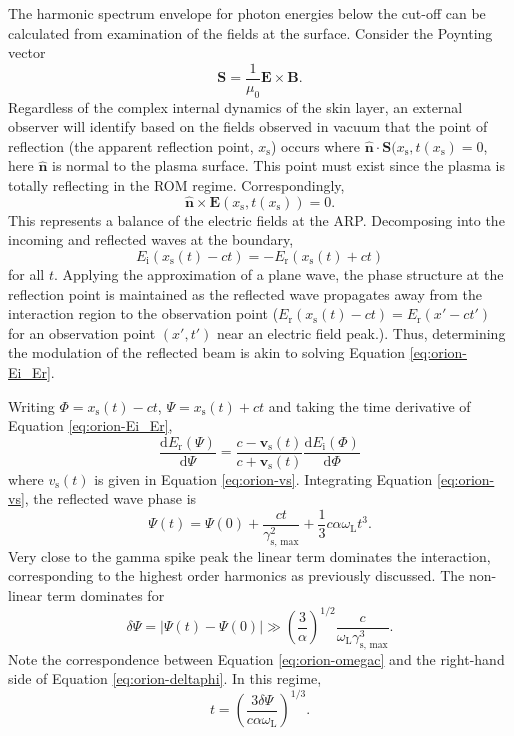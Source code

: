 The harmonic spectrum envelope for photon energies below the cut-off can be calculated from examination of the fields at the surface. 
Consider the Poynting vector
\begin{equation}
	\mathbf{S} = \frac{1}{\mu_0}\mathbf{E}\times\mathbf{B}.
\end{equation}
Regardless of the complex internal dynamics of the skin layer, an external observer will identify based on the fields observed in vacuum that the point of reflection (the apparent reflection point, $x_\mathrm{s}$) occurs where $\hat{\mathbf{n}}\cdot\mathbf{S}(x_\mathrm{s},t(x_\mathrm{s}) = 0$, here $\hat{\mathbf{n}}$ is normal to the plasma surface. This point must exist since the plasma is totally reflecting in the ROM regime. Correspondingly,
\begin{equation}
	\hat{\mathbf{n}}\times \mathbf{E}(x_\mathrm{s},t(x_\mathrm{s})) = 0.
\end{equation}
This represents a balance of the electric fields at the ARP. Decomposing into the incoming and reflected waves at the boundary,
\begin{equation}\label{eq:orion-Ei_Er}
	E_\mathrm{i}(x_\mathrm{s}(t) - ct) = - E_\mathrm{r}(x_\mathrm{s}(t) + ct)
\end{equation}
for all $t$. Applying the approximation of a plane wave, the phase structure at the reflection point is maintained as the reflected wave propagates away from the interaction region to the observation point ($E_\mathrm{r}(x_\mathrm{s}(t) - ct) = E_\mathrm{r}(x' - ct')$ for an observation point $(x',t')$ near an electric field peak.). Thus, determining the modulation of the reflected beam is akin to solving Equation \ref{eq:orion-Ei_Er}. 

Writing $\Phi = x_\mathrm{s}(t) - ct$, $\Psi = x_\mathrm{s}(t) + ct$ and taking the time derivative of Equation \ref{eq:orion-Ei_Er},
\begin{equation}
	\frac{\mathrm{d}E_\mathrm{r}(\Psi)}{\mathrm{d}\Psi} = \frac{c - \mathbf{v}_\mathrm{s}(t)}{c+\mathbf{v}_\mathrm{s}(t)}\frac{\mathrm{d}E_\mathrm{i}(\Phi)}{\mathrm{d}\Phi}
\end{equation}
where $v_\mathrm{s}(t)$ is given in Equation \ref{eq:orion-vs}. Integrating Equation \ref{eq:orion-vs}, the reflected wave phase is
\begin{equation}
	\Psi(t) = \Psi(0) + \frac{ct}{\gamma_\mathrm{s,\, max}^2} + \frac{1}{3}c\alpha \omega_\mathrm{L}t^3.
\end{equation}
Very close to the gamma spike peak the linear term dominates the interaction, corresponding to the highest order harmonics as previously discussed. The non-linear term dominates for 
\begin{equation}\label{eq:orion-deltaphi}
	\delta \Psi = |\Psi(t) - \Psi(0)| \gg \left(\frac{3}{\alpha}\right)^{1/2}\frac{c}{\omega_\mathrm{L}\gamma_\mathrm{s,\, max}^3}.
\end{equation}
Note the correspondence between Equation \ref{eq:orion-omegac} and the right-hand side of Equation \ref{eq:orion-deltaphi}. In this regime,
\begin{equation}
	t = \left(\frac{3\delta \Psi }{c\alpha \omega_\mathrm{L}}\right)^{1/3}.
\end{equation}

